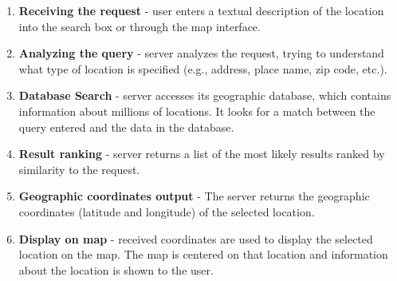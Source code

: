 \documentclass[10pt,oneside,english,a4paper]{article}
\begin{document}
\begin{enumerate}
\item \textbf{Receiving the request} - user enters a textual description of the location into the search box or through the map interface.
\item \textbf{Analyzing the query} - server analyzes the request, trying to understand what type of location is specified (e.g., address, place name, zip code, etc.).
\item \textbf{Database Search} - server accesses its geographic database, which contains information about millions of locations. It looks for a match between the query entered and the data in the database.
\item \textbf{Result ranking} - server returns a list of the most likely results ranked by similarity to the request. 
\item \textbf{Geographic coordinates output} - The server returns the geographic coordinates (latitude and longitude) of the selected location.
\item \textbf{Display on map} - received coordinates are used to display the selected location on the map. The map is centered on that location and information about the location is shown to the user.
\end{enumerate}
\end{document}
